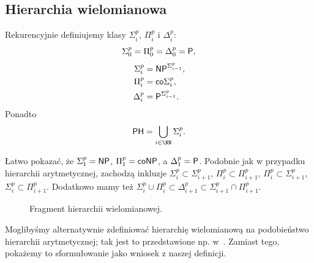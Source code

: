 \subsection{Hierarchia wielomianowa}

\begin{definition}
    Rekurencyjnie definiujemy klasy $\Sigma_i^p$, $\Pi_i^p$ i $\Delta_i^p$:
    \[ \Sigma_0^p = \Pi_0^p = \Delta_0^p = \textsf{P}, \]
    \begin{align*}
        \Sigma_i^p &= \textsf{NP}^{\Sigma_{i-1}^p}, \\
        \Pi_i^p &= \textsf{co} \Sigma_i^p, \\
        \Delta_i^p &= \textsf{P}^{\Sigma_{i-1}^p}.
    \end{align*}
    Ponadto
    \[ \PHclass = \bigcup_{i \in \NN} \Sigma_i^p. \]
\end{definition}

Łatwo pokazać, że $\Sigma_1^p = \textsf{NP}$, $\Pi_1^p = \textsf{coNP}$, a $\Delta_1^p = \textsf{P}$. Podobnie jak w przypadku hierarchii arytmetycznej, zachodzą inkluzje $\Sigma_i^p \subset \Sigma_{i+1}^p$, $\Pi_i^p \subset \Pi_{i+1}^p$, $\Pi_i^p \subset \Sigma_{i+1}^p$, $\Sigma_i^p \subset \Pi_{i+1}^p$. Dodatkowo mamy też $\Sigma_i^p \cup \Pi_i^p \subset \Delta_{i+1}^p \subset \Sigma_{i+1}^p \cap \Pi_{i+1}^p$.

\begin{figure}[h]
    \centering
    
    \caption{Fragment hierarchii wielomianowej.}
\end{figure}

Moglibyśmy alternatywnie zdefiniować hierarchię wielomianową na podobieństwo hierarchii arytmetycznej; tak jest to przedstawione np. w~\cite{AroraBarak}. Zamiast tego, pokażemy to sformułowanie jako wniosek z naszej definicji.


